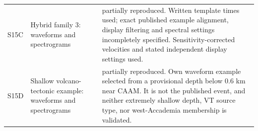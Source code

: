 \begin{longtable}{>{\raggedright\arraybackslash}p{.13\linewidth}>{\raggedright\arraybackslash}p{.28\linewidth}>{\raggedright\arraybackslash}p{.49\linewidth}}
S15C & Hybrid family 3: waveforms and spectrograms & partially reproduced. Written template times used; exact published example alignment, display filtering and spectral settings incompletely specified. Sensitivity-corrected velocities and stated independent display settings used.\\[3pt]
S15D & Shallow volcano-tectonic example: waveforms and spectrograms & partially reproduced. Own waveform example selected from a provisional depth below 0.6 km near CAAM. It is not the published event, and neither extremely shallow depth, VT source type, nor west-Accademia membership is validated.\\[3pt]
\bottomrule\end{longtable}
